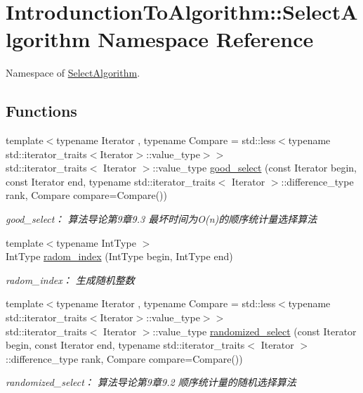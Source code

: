 \hypertarget{namespace_introdunction_to_algorithm_1_1_select_algorithm}{}\section{Introdunction\+To\+Algorithm\+:\+:Select\+Algorithm Namespace Reference}
\label{namespace_introdunction_to_algorithm_1_1_select_algorithm}


Namespace of \hyperlink{namespace_introdunction_to_algorithm_1_1_select_algorithm}{Select\+Algorithm}.  


\subsection*{Functions}
\begin{DoxyCompactItemize}
\item 
{\footnotesize template$<$typename Iterator , typename Compare  = std\+::less$<$typename std\+::iterator\+\_\+traits$<$\+Iterator$>$\+::value\+\_\+type$>$$>$ }\\std\+::iterator\+\_\+traits$<$ Iterator $>$\+::value\+\_\+type \hyperlink{namespace_introdunction_to_algorithm_1_1_select_algorithm_a1a12272ccfaf7b91916aed885085b86c}{good\+\_\+select} (const Iterator begin, const Iterator end, typename std\+::iterator\+\_\+traits$<$ Iterator $>$\+::difference\+\_\+type rank, Compare compare=Compare())
\begin{DoxyCompactList}\small\item\em good\+\_\+select： 算法导论第9章9.3 最坏时间为\+O(n)的顺序统计量选择算法 \end{DoxyCompactList}\item 
{\footnotesize template$<$typename Int\+Type $>$ }\\Int\+Type \hyperlink{namespace_introdunction_to_algorithm_1_1_select_algorithm_acb1b35e9cb2c25d81a69b5a1147504a4}{radom\+\_\+index} (Int\+Type begin, Int\+Type end)
\begin{DoxyCompactList}\small\item\em radom\+\_\+index： 生成随机整数 \end{DoxyCompactList}\item 
{\footnotesize template$<$typename Iterator , typename Compare  = std\+::less$<$typename std\+::iterator\+\_\+traits$<$\+Iterator$>$\+::value\+\_\+type$>$$>$ }\\std\+::iterator\+\_\+traits$<$ Iterator $>$\+::value\+\_\+type \hyperlink{namespace_introdunction_to_algorithm_1_1_select_algorithm_a08910fcecf3bf8711f109eec310f5a9b}{randomized\+\_\+select} (const Iterator begin, const Iterator end, typename std\+::iterator\+\_\+traits$<$ Iterator $>$\+::difference\+\_\+type rank, Compare compare=Compare())
\begin{DoxyCompactList}\small\item\em randomized\+\_\+select： 算法导论第9章9.2 顺序统计量的随机选择算法 \end{DoxyCompactList}\end{DoxyCompactItemize}


